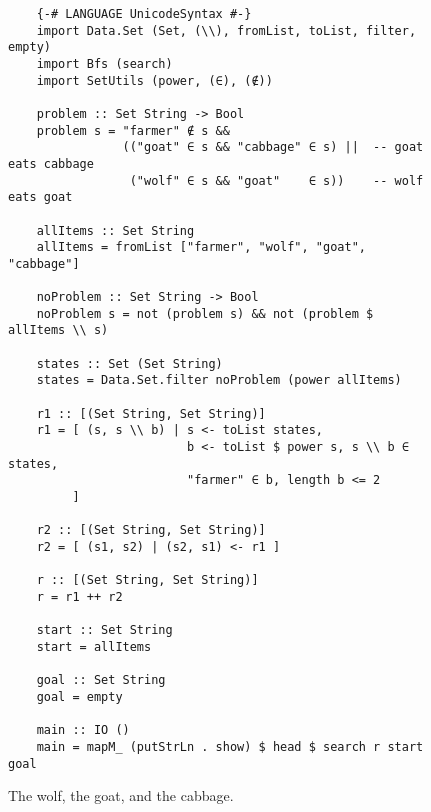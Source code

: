 \begin{figure}[!ht]
\centering
\begin{verbatim}
    {-# LANGUAGE UnicodeSyntax #-}
    import Data.Set (Set, (\\), fromList, toList, filter, empty)
    import Bfs (search)
    import SetUtils (power, (∈), (∉))
      
    problem :: Set String -> Bool
    problem s = "farmer" ∉ s &&
                (("goat" ∈ s && "cabbage" ∈ s) ||  -- goat eats cabbage
                 ("wolf" ∈ s && "goat"    ∈ s))    -- wolf eats goat
    
    allItems :: Set String
    allItems = fromList ["farmer", "wolf", "goat", "cabbage"]
    
    noProblem :: Set String -> Bool
    noProblem s = not (problem s) && not (problem $ allItems \\ s)
    
    states :: Set (Set String)
    states = Data.Set.filter noProblem (power allItems)
    
    r1 :: [(Set String, Set String)]
    r1 = [ (s, s \\ b) | s <- toList states,
                         b <- toList $ power s, s \\ b ∈ states,
                         "farmer" ∈ b, length b <= 2
         ]
    
    r2 :: [(Set String, Set String)]
    r2 = [ (s1, s2) | (s2, s1) <- r1 ]
    
    r :: [(Set String, Set String)]
    r = r1 ++ r2
    
    start :: Set String
    start = allItems
    
    goal :: Set String
    goal = empty
    
    main :: IO ()
    main = mapM_ (putStrLn . show) $ head $ search r start goal 
\end{verbatim}
\vspace*{-0.3cm}
\caption{The wolf, the goat, and the cabbage.}
\label{fig:wolf-goat-cabbage.hs}
\end{figure}

